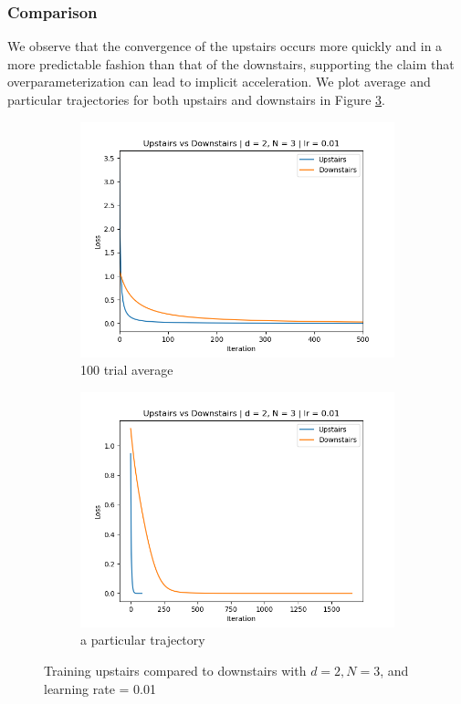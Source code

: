 \documentclass[11pt]{article}
\begin{document}
\subsubsection{Comparison}
We observe that the convergence of the upstairs occurs more quickly and in a more predictable fashion than that of the downstairs, supporting the claim that overparameterization can lead to implicit acceleration. We plot average and particular trajectories for both upstairs and downstairs in Figure \ref{fig:upstairs_downstairs}.
\begin{figure}[ht]
    \begin{subfigure}{0.5\textwidth}
        \centering
        \includegraphics[width=\textwidth]{images/upstairs_downstairs_avg_lr1e-2.png}
        \caption{100 trial average}
        \label{fig:upstairs_downstairs_avg}
    \end{subfigure}
    \begin{subfigure}{0.5\textwidth}
        \centering
        \includegraphics[width=\textwidth]{images/upstairs_downstairs_1_lr1e-2.png}
        \caption{a particular trajectory}
        \label{fig:upstairs_downstairs_1}
    \end{subfigure}
    \caption{Training upstairs compared to downstairs with $d = 2, N = 3$, and learning rate = 0.01}
    \label{fig:upstairs_downstairs}
\end{figure}
\end{document}
